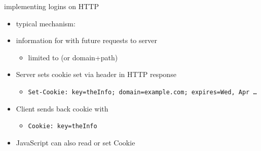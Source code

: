 
\begin{frame}{implementing logins on HTTP}
    \begin{itemize}
        \item typical mechanism: 
        \item information for  with future requests to server
        \begin{itemize}
            \item limited to  (or domain+path)
        \end{itemize}
    \item Server sets cookie set via header in HTTP response
        \begin{itemize}
            \item \texttt{\fontsize{10}{10}\selectfont Set-Cookie: key=theInfo; domain=example.com; expires=Wed, Apr \ldots}
        \end{itemize}
    \item Client sends back cookie with 
        \begin{itemize}
            \item \texttt{\fontsize{10}{10}\selectfont Cookie: key=theInfo}
        \end{itemize}
    \item JavaScript can also read or set Cookie
    \end{itemize}
\end{frame}
